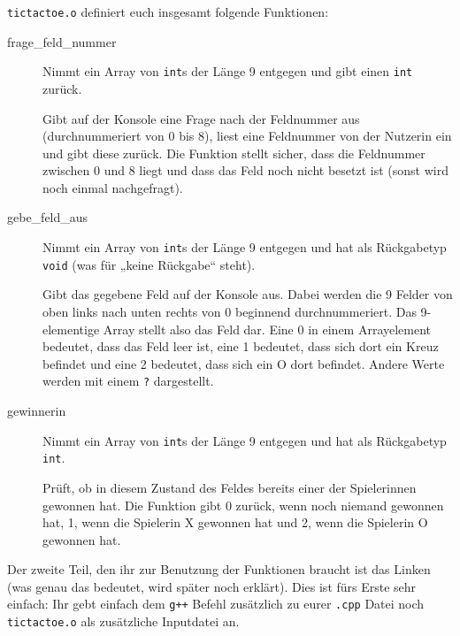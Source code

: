 \texttt{tictactoe.o} definiert euch insgesamt folgende Funktionen:
\begin{description}
    \item[frage\_feld\_nummer]
        Nimmt ein Array von \texttt{int}s der Länge 9 entgegen und gibt einen
        \texttt{int} zurück.

        Gibt auf der Konsole eine Frage nach der Feldnummer aus
        (durchnummeriert von 0 bis 8), liest eine Feldnummer von der Nutzerin
        ein und gibt diese zurück. Die Funktion stellt sicher, dass die
        Feldnummer zwischen 0 und 8 liegt und dass das Feld noch nicht besetzt
        ist (sonst wird noch einmal nachgefragt).
    \item[gebe\_feld\_aus]
        Nimmt ein Array von \texttt{int}s der Länge 9 entgegen und hat als
        Rückgabetyp \texttt{void} (was für „keine Rückgabe“ steht).

        Gibt das gegebene Feld auf der Konsole aus. Dabei werden die 9 Felder
        von oben links nach unten rechts von 0 beginnend durchnummeriert. Das
        9-elementige Array stellt also das Feld dar. Eine 0 in einem
        Arrayelement bedeutet, dass das Feld leer ist, eine 1 bedeutet, dass
        sich dort ein Kreuz befindet und eine 2 bedeutet, dass sich ein O dort
        befindet. Andere Werte werden mit einem \texttt{?} dargestellt.
    \item[gewinnerin]
        Nimmt ein Array von \texttt{int}s der Länge 9 entgegen und hat als
        Rückgabetyp \texttt{int}.

        Prüft, ob in diesem Zustand des Feldes bereits einer der Spielerinnen
        gewonnen hat. Die Funktion gibt 0 zurück, wenn noch niemand gewonnen
        hat, 1, wenn die Spielerin X gewonnen hat und 2, wenn die Spielerin O
        gewonnen hat.
\end{description}

Der zweite Teil, den ihr zur Benutzung der Funktionen braucht ist das Linken
(was genau das bedeutet, wird später noch erklärt). Dies ist fürs Erste sehr
einfach: Ihr gebt einfach dem \texttt{g++} Befehl zusätzlich zu eurer
\texttt{.cpp} Datei noch \texttt{tictactoe.o} als zusätzliche Inputdatei an.


